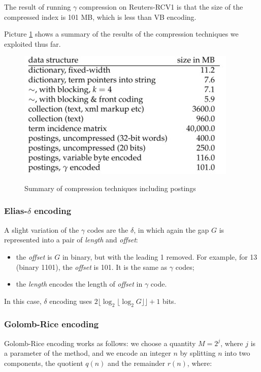 The result of running $\gamma$ compression on Reuters-RCV1 is that the size of the compressed index is 101 MB, which is less than VB encoding.

Picture \ref{summary with post} shows a summary of the results of the compression techniques we exploited thus far.

\begin{figure}[h!]
		\centering
		\includegraphics[scale = 2.0]{img/summary with postings.jpg}
		\label{summary with post}
        \caption{Summary of compression techniques including postings}
\end{figure}

\subsubsection{Elias-$\delta$ encoding}
A slight variation of the $\gamma$ codes are the $\delta$, in which again the gap $G$ is represented into a pair of \textit{length} and \textit{offset}:

\begin{itemize}
    \item the \textit{offset} is $G$ in binary, but with the leading 1 removed. For example, for 13 (binary 1101), the \textit{offset} is 101. It is the same as $\gamma$ codes;
    \item the \textit{length} encodes the length of \textit{offset} in $\gamma$ code.
\end{itemize}

In this case, $\delta$ encoding uses $2 \lfloor \log_2 \lfloor \log_2 G \rfloor \rfloor + 1$ bits.

\subsubsection{Golomb-Rice encoding}
Golomb-Rice encoding works as follows: we choose a quantity $M = 2^j$, where $j$ is a parameter of the method, and we encode an integer $n$ by splitting $n$ into two components, the quotient $q(n)$ and the remainder $r(n)$, where:

